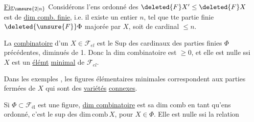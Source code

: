 
\uline{Fig}$_{\unsure{2|n}}$  Considérons l'ens ordonné des $\deleted{F}X'\leq\deleted{F}X$ est de \uline{dim comb. finie}, i.e. il existe un entier $n$, tel que tte partie finie $\deleted{\unsure{F}}\Phi$  majorée par $X$,  soit de cardinal $\leq n$.

La \uline{} \uline{combinatoire} d'un $X\in\mathcal{F}_{el}$ est le Sup des cardinaux des parties finies $\Phi$ précédentes, diminués de 1. Donc la dim combinatoire est $\geq 0$, et elle est nulle ssi $X$ est un \uline{élémt} \uline{minimal} de $\mathcal{F}_{el}$.

Dans les exemples ,  les figures élémentaires minimales correspondent aux parties fermées de $X$ qui sont des \uline{variétés} \uline{connexes}.

Si $\Phi\subset\mathcal{F}_{\text{él}}$ est une figure,  \uline{dim combinatoire} est sa dim comb en tant qu'ens ordonné, c'est  le sup des $\mathrm{dim\,comb}\,X$, pour $X\in\Phi$. Elle est nulle ssi   la relation
